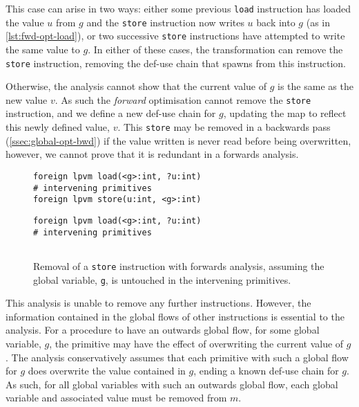 This case can arise in two ways: either some previous \texttt{load} instruction has loaded the value $u$ from $g$ and the \texttt{store} instruction now writes $u$ back into $g$ (as in \cref{lst:fwd-opt-load}), or two successive \texttt{store} instructions have attempted to write the same value to $g$. In either of these cases, the transformation can remove the \texttt{store} instruction, removing the def-use chain that spawns from this instruction. 

Otherwise, the analysis cannot show that the current value of $g$ is the same as the new value $v$. As such the \textit{forward} optimisation cannot remove the \texttt{store} instruction, and we define a new def-use chain for $g$, updating the map to reflect this newly defined value, $v$. This \texttt{store} may be removed in a backwards pass (\cref{ssec:global-opt-bwd}) if the value written is never read before being overwritten, however, we cannot prove that it is redundant in a forwards analysis.

\begin{figure}[ht]
  \begin{minipage}[t]{.48\textwidth}
    \begin{lstlisting}
foreign lpvm load(<g>:int, ?u:int)
# intervening primitives
foreign lpvm store(u:int, <g>:int)
\end{lstlisting}
  \end{minipage}\hfill
  \begin{minipage}[t]{.48\textwidth}
    \begin{lstlisting}[numbers=none, showlines]
foreign lpvm load(<g>:int, ?u:int)
# intervening primitives
 
\end{lstlisting}
  \end{minipage}
  \caption[Removal of a \texttt{store} instruction with forwards analysis.]{Removal of a \texttt{store} instruction with forwards analysis, assuming the global variable, \texttt{g}, is untouched in the intervening primitives.}
  \label{lst:fwd-opt-store}
\end{figure}

This analysis is unable to remove any further instructions. However, the information contained in the global flows of other instructions is essential to the analysis. For a procedure to have an outwards global flow, for some global variable, $g$, the primitive may have the effect of overwriting the current value of $g$. The analysis conservatively assumes that each primitive with such a global flow for $g$ does overwrite the value contained in $g$, ending a known def-use chain for $g$. As such, for all global variables with such an outwards global flow, each global variable and associated value must be removed from $m$. 

